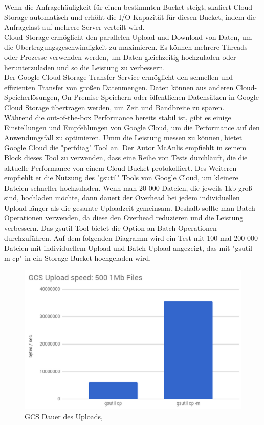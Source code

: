  Wenn die Anfragehäufigkeit für einen bestimmten Bucket steigt, skaliert Cloud Storage automatisch und erhöht die I/O Kapazität für diesen Bucket, indem die Anfragelast auf mehrere Server verteilt wird.\\
 
Cloud Storage ermöglicht den parallelen Upload und Download von Daten, um die Übertragungsgeschwindigkeit zu maximieren. Es können mehrere Threads oder Prozesse verwenden werden, um Daten gleichzeitig hochzuladen oder herunterzuladen und so die Leistung zu verbessern.\\

Der Google Cloud Storage Transfer Service ermöglicht den schnellen und effizienten Transfer von großen Datenmengen. Daten können aus anderen Cloud-Speicherlösungen, On-Premise-Speichern oder öffentlichen Datensätzen in Google Cloud Storage übertragen werden, um Zeit und Bandbreite zu sparen.\\

Während die out-of-the-box Performance bereits stabil ist, gibt es einige Einstellungen und Empfehlungen von Google Cloud, um die Performance auf den Anwendungsfall zu optimieren. Umm die Leistung messen zu können, bietet Google Cloud die "perfdiag" Tool an. Der Autor McAnlis empfiehlt in seinem Block  dieses Tool zu verwenden, dass eine Reihe von Tests durchläuft, die die aktuelle Performance von einem Cloud Bucket protokolliert. Des Weiteren empfiehlt er die Nutzung des "gsutil" Tools von Google Cloud, um kleinere Dateien schneller hochzuladen. Wenn man 20 000 Dateien, die jeweils 1kb groß sind, hochladen möchte, dann dauert der Overhead bei jedem individuellen Upload länger als die gesamte Uploadzeit gemeinsam. Deshalb sollte man Batch Operationen verwenden, da diese den Overhead reduzieren und die Leistung verbessern. Das gsutil Tool bietet die Option an Batch Operationen durchzuführen. Auf dem folgenden Diagramm wird ein Test mit 100 mal 200 000 Dateien mit individuellem Upload und Batch Upload angezeigt, das mit "gsutil -m cp" in ein Storage Bucket hochgeladen wird.

\begin{figure}[!h]
	\centering
	\includegraphics[width=12cm,keepaspectratio]{Pictures/cloud-storage-performance.png}
	\caption{GCS Dauer des Uploads, }
\end{figure}

